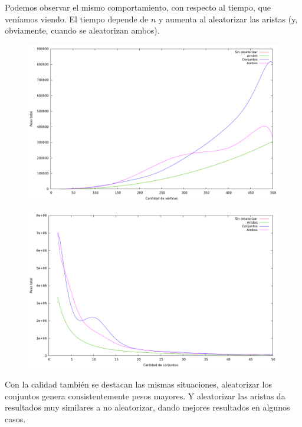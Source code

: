 Podemos observar el mismo comportamiento, con respecto al tiempo, que veníamos
viendo. El tiempo depende de $n$ y aumenta al aleatorizar las aristas (y,
obviamente, cuando se aleatorizan ambos).

\begin{figure}[H]
  \begin{center}
    \includegraphics[scale=0.35]{imagenes/grasp-goloso-n-peso.png}
  \end{center}
\end{figure}

\begin{figure}[H]
  \begin{center}
    \includegraphics[scale=0.35]{imagenes/grasp-goloso-k-peso.png}
  \end{center}
\end{figure}

Con la calidad también se destacan las mismas situaciones, aleatorizar los
conjuntos genera consistentemente pesos mayores. Y aleatorizar las aristas da
resultados muy similares a no aleatorizar, dando mejores resultados en algunos
casos.

